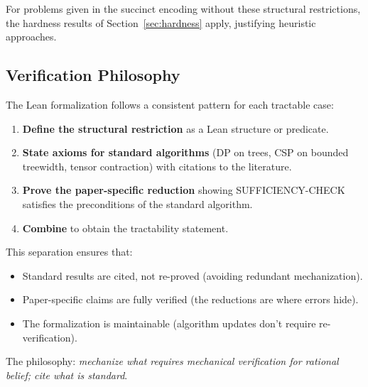 For problems given in the succinct encoding without these structural restrictions, the hardness results of Section~\ref{sec:hardness} apply, justifying heuristic approaches.

\subsection{Verification Philosophy}\label{sec:tract-verification}

The Lean formalization follows a consistent pattern for each tractable case:

\begin{enumerate}
\item \textbf{Define the structural restriction} as a Lean structure or predicate.
\item \textbf{State axioms for standard algorithms} (DP on trees, CSP on bounded treewidth, tensor contraction) with citations to the literature.
\item \textbf{Prove the paper-specific reduction} showing SUFFICIENCY-CHECK satisfies the preconditions of the standard algorithm.
\item \textbf{Combine} to obtain the tractability statement.
\end{enumerate}

This separation ensures that:
\begin{itemize}
\item Standard results are cited, not re-proved (avoiding redundant mechanization).
\item Paper-specific claims are fully verified (the reductions are where errors hide).
\item The formalization is maintainable (algorithm updates don't require re-verification).
\end{itemize}

The philosophy: \emph{mechanize what requires mechanical verification for rational belief; cite what is standard}.